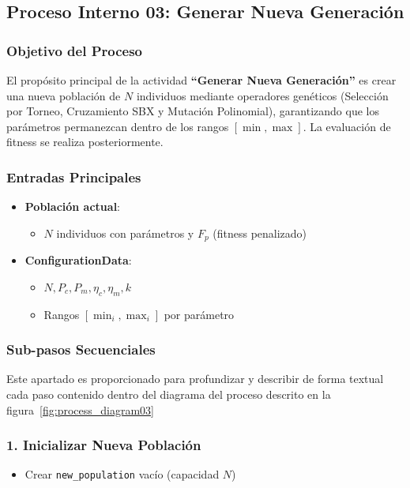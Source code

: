 \subsection{Proceso Interno 03: Generar Nueva Generación}

\subsubsection{Objetivo del Proceso}
El propósito principal de la actividad \textbf{``Generar Nueva Generación''} es crear una nueva población de $N$ individuos mediante operadores genéticos (Selección por Torneo, Cruzamiento SBX y Mutación Polinomial), garantizando que los parámetros permanezcan dentro de los rangos $[\min, \max]$. La evaluación de fitness se realiza posteriormente.

\subsubsection{Entradas Principales}
\begin{itemize}
    \item \textbf{Población actual}:
    \begin{itemize}
        \item $N$ individuos con parámetros y $F_p$ (fitness penalizado)
    \end{itemize}
    \item \textbf{ConfigurationData}:
    \begin{itemize}
        \item $N, P_c, P_m, \eta_c, \eta_m, k$
        \item Rangos $[\min_i, \max_i]$ por parámetro
    \end{itemize}
\end{itemize}

\subsubsection{Sub-pasos Secuenciales}
Este apartado es proporcionado para profundizar y describir de forma textual cada paso contenido dentro del diagrama del proceso descrito en la figura~\ref{fig:process_diagram03}
\subsubsection*{1. Inicializar Nueva Población}
\begin{itemize}
    \item Crear \texttt{new\_population} vacío (capacidad $N$)
\end{itemize}

